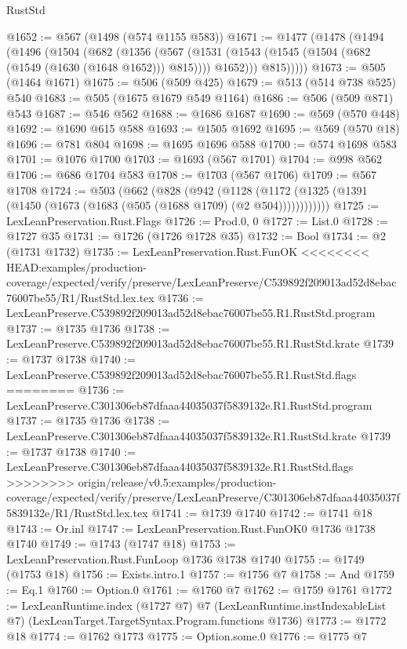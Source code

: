 \begin{lexlean}{RustStd}
\begin{coremodule}
{\begin{coremodule}
{{{{{{{{{{{{{{{@1652 := @567 (@1498 (@574 @1155 @583))
@1671 := @1477
    (@1478
      (@1494
        (@1496
          (@1504
            (@682
              (@1356
                (@567
                  (@1531 (@1543 (@1545 (@1504 (@682 (@1549 (@1630 (@1648 @1652))) @815)))) @1652)))
              @815)))))
@1673 := @505 (@1464 @1671)
@1675 := @506 (@509 @425)
@1679 := @513 (@514 @738 @525) @540
@1683 := @505 (@1675 @1679 @549 @1164)
@1686 := @506 (@509 @871) @543
@1687 := @546 @562
@1688 := @1686 @1687
@1690 := @569 (@570 @448)
@1692 := @1690 @615 @588
@1693 := @1505 @1692
@1695 := @569 (@570 @18)
@1696 := @781 @804
@1698 := @1695 @1696 @588
@1700 := @574 @1698 @583
@1701 := @1076 @1700
@1703 := @1693 (@567 @1701)
@1704 := @998 @562
@1706 := @686 @1704 @583
@1708 := @1703 (@567 @1706)
@1709 := @567 @1708
@1724 := @503
    (@662
      (@828
        (@942
          (@1128 (@1172 (@1325 (@1391 (@1450 (@1673 (@1683 (@505 (@1688 @1709) (@2 @504))))))))))))
@1725 := LexLeanPreservation.Rust.Flags
@1726 := Prod.{0, 0}
@1727 := List.{0}
@1728 := @1727 @35
@1731 := @1726 (@1726 @1728 @35)
@1732 := Bool
@1734 := @2 (@1731 @1732)
@1735 := LexLeanPreservation.Rust.FunOK
<<<<<<<< HEAD:examples/production-coverage/expected/verify/preserve/LexLeanPreserve/C539892f209013ad52d8ebac76007be55/R1/RustStd.lex.tex
@1736 := LexLeanPreserve.C539892f209013ad52d8ebac76007be55.R1.RustStd.program
@1737 := @1735 @1736
@1738 := LexLeanPreserve.C539892f209013ad52d8ebac76007be55.R1.RustStd.krate
@1739 := @1737 @1738
@1740 := LexLeanPreserve.C539892f209013ad52d8ebac76007be55.R1.RustStd.flags
========
@1736 := LexLeanPreserve.C301306eb87dfaaa44035037f5839132e.R1.RustStd.program
@1737 := @1735 @1736
@1738 := LexLeanPreserve.C301306eb87dfaaa44035037f5839132e.R1.RustStd.krate
@1739 := @1737 @1738
@1740 := LexLeanPreserve.C301306eb87dfaaa44035037f5839132e.R1.RustStd.flags
>>>>>>>> origin/release/v0.5:examples/production-coverage/expected/verify/preserve/LexLeanPreserve/C301306eb87dfaaa44035037f5839132e/R1/RustStd.lex.tex
@1741 := @1739 @1740
@1742 := @1741 @18
@1743 := Or.inl
@1747 := LexLeanPreservation.Rust.FunOK0 @1736 @1738 @1740
@1749 := @1743 (@1747 @18)
@1753 := LexLeanPreservation.Rust.FunLoop @1736 @1738 @1740
@1755 := @1749 (@1753 @18)
@1756 := Exists.intro.{1}
@1757 := @1756 @7
@1758 := And
@1759 := Eq.{1}
@1760 := Option.{0}
@1761 := @1760 @7
@1762 := @1759 @1761
@1772 := LexLeanRuntime.index
    (@1727 @7)
    @7
    (LexLeanRuntime.instIndexableList @7)
    (LexLeanTarget.TargetSyntax.Program.functions @1736)
@1773 := @1772 @18
@1774 := @1762 @1773
@1775 := Option.some.{0}
@1776 := @1775 @7
}}}}}}}}}}}}}}}
\end{coremodule}}
\end{coremodule}
\end{lexlean}
